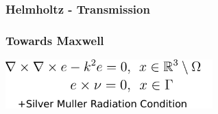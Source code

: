 \begin{frame}

    \frametitle{Helmholtz - Transmission}

\end{frame}


\begin{frame}

    \frametitle{Towards Maxwell}

    \centering
    \includegraphics[width=0.6\textwidth]{assets/maxwell_scattering.pdf}

\end{frame}